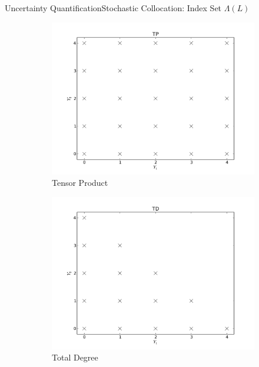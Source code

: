 \documentclass{beamer}
\begin{document}
\begin{frame}{Uncertainty Quantification}{Stochastic Collocation: Index Set $\Lambda(L)$}\vspace{-20pt}
\begin{figure}[H]
\centering
  \begin{subfigure}[b]{0.32 \textwidth}
   \includegraphics[width=\textwidth]{../graphics/TP}
   \caption{Tensor Product}
   \label{TP}
  \end{subfigure}
  \begin{subfigure}[b]{0.32 \textwidth}
   \includegraphics[width=\textwidth]{../graphics/TD}
   \caption{Total Degree}
   \label{TD}
  \end{subfigure}
  \begin{subfigure}[b]{0.32 \textwidth}

\end{subfigure}
\end{figure}
\end{frame}
\end{document}
